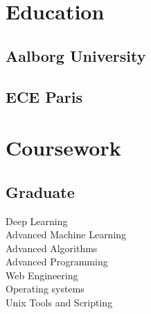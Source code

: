 \documentclass[letterpaper]{deedy-resume} %
\begin{document}
\begin{minipage}[t]{0.33\textwidth} %


\section{Education} 

\subsection{Aalborg University}


\sectionspace %

\subsection{ECE Paris}




\sectionspace %


\section{Coursework}

\subsection{Graduate}

Deep Learning \\
Advanced Machine Learning \\
Advanced Algorithms \\
Advanced Programming\\
Web Engineering \\
Operating systems \\
Unix Tools and Scripting\\

\sectionspace %



\end{minipage}
\end{document}

